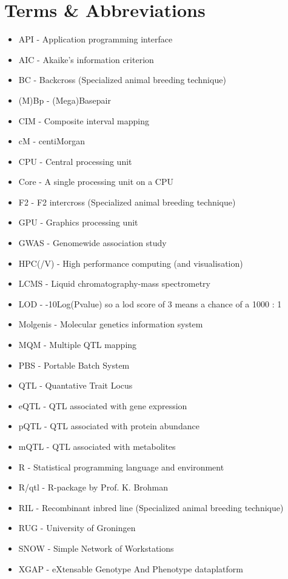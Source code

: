 \newpage
\section*{Terms \& Abbreviations}
\begin{itemize}
	\item API - Application programming interface 
	\item AIC - Akaike's information criterion
	\item BC - Backcross (Specialized animal breeding technique)
  \item (M)Bp - (Mega)Basepair
	\item CIM - Composite interval mapping
	\item cM - centiMorgan
  \item CPU - Central processing unit
  \item Core - A single processing unit on a CPU
	\item F2 - F2 intercross (Specialized animal breeding technique)
  \item GPU - Graphics processing unit
  \item GWAS - Genomewide association study
	\item HPC(/V) - High performance computing (and visualisation)
	\item LCMS - Liquid chromatography-mass spectrometry
	\item LOD - -10Log(Pvalue) so a lod score of 3 means a chance of a 1000 : 1
  \item Molgenis - Molecular genetics information system
	\item MQM - Multiple QTL mapping \cite{jansen93}
	\item PBS - Portable Batch System \cite{PBS2000}
	\item QTL - Quantative Trait Locus
	\item eQTL - QTL associated with gene expression
	\item pQTL - QTL associated with protein abundance
	\item mQTL - QTL associated with metabolites
  \item R - Statistical programming language and environment
  \item R/qtl - R-package by Prof. K. Brohman
  \item RIL - Recombinant inbred line (Specialized animal breeding technique)
	\item RUG - University of Groningen
  \item SNOW - Simple Network of Workstations \cite{tierney04}
	\item XGAP - eXtensable Genotype And Phenotype dataplatform
\end{itemize}
